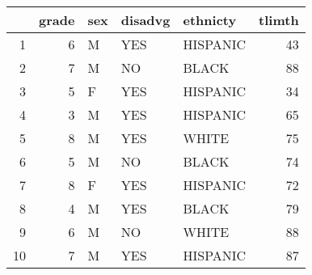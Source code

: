 \documentclass{article}
\begin{document}
\begin{table}[ht]
\centering
\begin{tabular}{rrlllr}
  \hline
 & grade & sex & disadvg & ethnicty & tlimth \\
  \hline
1 &   6 & M & YES & HISPANIC &  43 \\
  2 &   7 & M & NO & BLACK &  88 \\
  3 &   5 & F & YES & HISPANIC &  34 \\
  4 &   3 & M & YES & HISPANIC &  65 \\
  5 &   8 & M & YES & WHITE &  75 \\
  6 &   5 & M & NO & BLACK &  74 \\
  7 &   8 & F & YES & HISPANIC &  72 \\
  8 &   4 & M & YES & BLACK &  79 \\
  9 &   6 & M & NO & WHITE &  88 \\
  10 &   7 & M & YES & HISPANIC &  87 \\
   \hline
\end{tabular}
\end{table}
\end{document}
